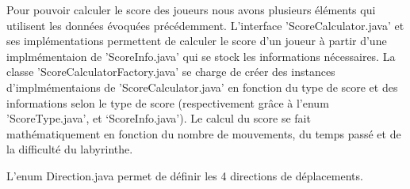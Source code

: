 Pour pouvoir calculer le score des joueurs nous avons plusieurs éléments qui utilisent les données évoquées précédemment. L'interface 'ScoreCalculator.java' et ses implémentations permettent de calculer le score d'un joueur à partir d'une implmémentaion de 'ScoreInfo.java' qui se stock les informations nécessaires. La classe 'ScoreCalculatorFactory.java' se charge de créer des instances d'implmémentaions de 'ScoreCalculator.java' en fonction du type de score et des informations selon le type de score (respectivement grâce à l'enum 'ScoreType.java', et `ScoreInfo.java'). Le calcul du score se fait mathématiquement en fonction du nombre de mouvements, du temps passé et de la difficulté du labyrinthe.

L'enum Direction.java permet de définir les 4 directions de déplacements.
